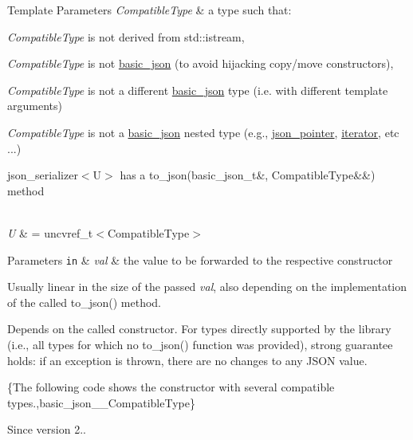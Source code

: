 \begin{DoxyTemplParams}{Template Parameters}
{\em Compatible\+Type} & a type such that\+:
\begin{DoxyItemize}
\item {\itshape Compatible\+Type} is not derived from {\ttfamily std\+::istream},
\item {\itshape Compatible\+Type} is not \mbox{\hyperlink{classnlohmann_1_1basic__json}{basic\+\_\+json}} (to avoid hijacking copy/move constructors),
\item {\itshape Compatible\+Type} is not a different \mbox{\hyperlink{classnlohmann_1_1basic__json}{basic\+\_\+json}} type (i.\+e. with different template arguments)
\item {\itshape Compatible\+Type} is not a \mbox{\hyperlink{classnlohmann_1_1basic__json}{basic\+\_\+json}} nested type (e.\+g., \mbox{\hyperlink{classnlohmann_1_1json__pointer}{json\+\_\+pointer}}, \mbox{\hyperlink{classnlohmann_1_1basic__json_a099316232c76c034030a38faa6e34dca}{iterator}}, etc ...)
\item json\+\_\+serializer$<$\+U$>$ has a {\ttfamily to\+\_\+json(basic\+\_\+json\+\_\+t\&, Compatible\+Type\&\&)} method
\end{DoxyItemize}\\
\hline
{\em U} & = {\ttfamily uncvref\+\_\+t$<$Compatible\+Type$>$}\\
\hline
\end{DoxyTemplParams}

\begin{DoxyParams}[1]{Parameters}
\mbox{\tt in}  & {\em val} & the value to be forwarded to the respective constructor\\
\hline
\end{DoxyParams}
Usually linear in the size of the passed {\itshape val}, also depending on the implementation of the called {\ttfamily to\+\_\+json()} method.

Depends on the called constructor. For types directly supported by the library (i.\+e., all types for which no {\ttfamily to\+\_\+json()} function was provided), strong guarantee holds\+: if an exception is thrown, there are no changes to any J\+S\+ON value.

\{The following code shows the constructor with several compatible types.,basic\+\_\+json\+\_\+\+\_\+\+Compatible\+Type\}

\begin{DoxySince}{Since}
version 2.. 
\end{DoxySince}
\mbox{\label{classnlohmann_1_1basic__json_aa16dc469c842fa8a0aaf6f5a95c46bb3}} 
